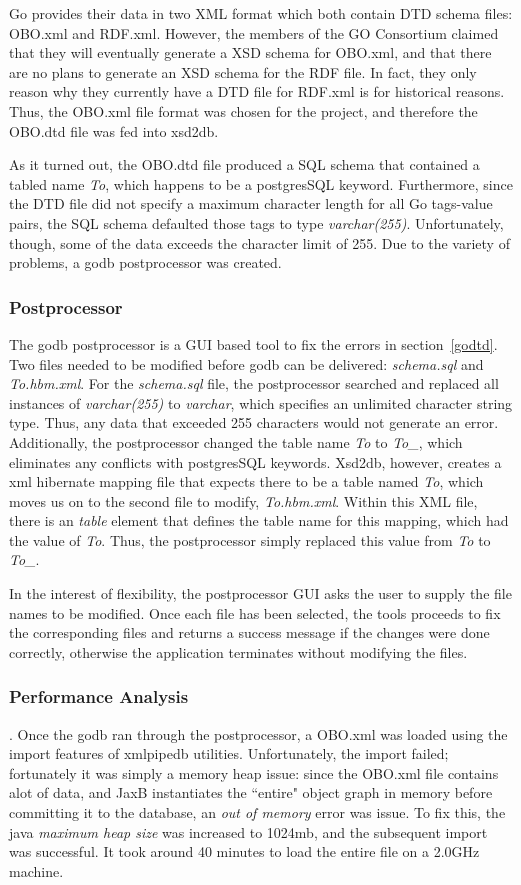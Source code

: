 Go provides their data in two XML format which both contain DTD schema files: OBO.xml and RDF.xml. However,
the members of the GO Consortium claimed that they will eventually generate a XSD schema for OBO.xml, and that there
are no plans to generate an XSD schema for the RDF file. In fact, they only reason why they currently have a DTD file
for RDF.xml is for historical reasons. Thus, the OBO.xml file format
was chosen for the project, and therefore the OBO.dtd file was fed into xsd2db.

As it turned out, the OBO.dtd file produced a SQL schema that contained a tabled name \emph{To}, which happens to be
a postgresSQL keyword. Furthermore, since the DTD file did not specify a maximum character length for all Go tags-value
pairs, the SQL schema defaulted those tags to type \emph{varchar(255)}. Unfortunately, though, some of the data exceeds the
character limit of 255. Due to the variety of problems, a godb postprocessor was created.

\subsubsection{Postprocessor}
The godb postprocessor is a GUI based tool to fix the errors in section~\ref{godtd}. Two files needed to be modified  before
godb can be delivered: \emph{schema.sql} and \emph{To.hbm.xml}. For the \emph{schema.sql} file, the postprocessor
searched and replaced all instances of \emph{varchar(255)} to \emph{varchar}, which specifies an unlimited character string type.
Thus, any data that exceeded 255 characters would not generate an error. Additionally,
the postprocessor changed the table name \emph{To} to  \emph{To\_}, which eliminates any conflicts with postgresSQL keywords.
Xsd2db, however,
creates a xml hibernate mapping file that expects there to be a table named \emph{To}, which moves us on to the second file to modify,
\emph{To.hbm.xml}. Within this XML file, there is an \emph{table} element that defines the table name for this mapping, which had the
value of \emph{To}. Thus, the postprocessor simply replaced this value from \emph{To} to \emph{To\_}.

In the interest of flexibility, the postprocessor GUI asks the user to supply the file names to be modified.
Once each file has been selected, the tools proceeds to fix the corresponding files and returns a success message
if the changes were done correctly, otherwise the application terminates without modifying the files.

\subsubsection{Performance Analysis}.
Once the godb ran through the postprocessor, a OBO.xml was loaded using the import features of xmlpipedb utilities.
Unfortunately, the import failed; fortunately it was simply a memory heap issue: since the OBO.xml file contains alot of data, and
JaxB instantiates the ``entire" object graph in memory before committing it to the database, an \emph{out of memory} error was issue.
To fix this, the java \emph{maximum heap size} was increased to 1024mb, and the subsequent import was successful. It took
around 40 minutes to load the entire file on a 2.0GHz machine.

